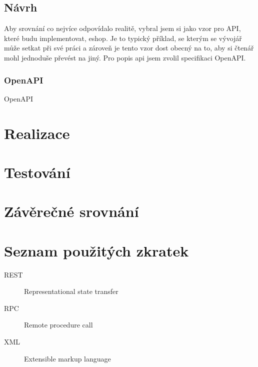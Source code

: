 \documentclass[thesis=M,czech]{FITthesis}[2019/12/23]
\begin{document}
\section{Návrh}
Aby srovnání co nejvíce odpovídalo realitě, vybral jsem si jako vzor pro API, které budu implementovat, eshop. Je to typický příklad, se kterým se vývojář může setkat při své práci a zároveň je tento vzor dost obecný na to, aby si čtenář mohl jednoduše převést na jiný. Pro popis api jsem zvolil specifikaci OpenAPI.

\subsection{OpenAPI}
OpenAPI 

\chapter{}

\chapter{Realizace}

\chapter{Testování}

\chapter{Závěrečné srovnání}

\begin{conclusion}
\end{conclusion}




\appendix

\chapter{Seznam použitých zkratek}
\begin{description}
	\item[REST] Representational state transfer
	\item[RPC] Remote procedure call
	\item[XML] Extensible markup language
\end{description}
\end{document}
